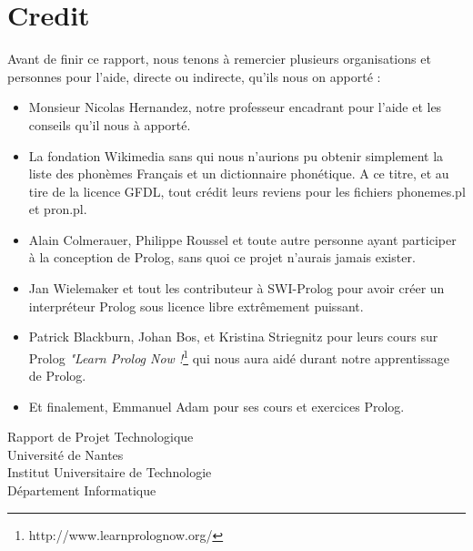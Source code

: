 \documentclass[11pt]{report}
\begin{document}
	\section{Credit}
	Avant de finir ce rapport, nous tenons à remercier plusieurs organisations et personnes pour l'aide, directe ou indirecte, qu'ils nous on apporté :
	\begin{itemize}
		\item Monsieur Nicolas Hernandez, notre professeur encadrant pour l'aide et les conseils qu'il nous à apporté.
		\item La fondation Wikimedia sans qui nous n'aurions pu obtenir simplement la liste des phonèmes Français et un dictionnaire phonétique. A ce titre, et au tire de la licence GFDL, tout crédit leurs reviens pour les fichiers phonemes.pl et pron.pl.
		\item Alain Colmerauer, Philippe Roussel et toute autre personne ayant participer à la conception de Prolog, sans quoi ce projet n'aurais jamais exister.
		\item Jan Wielemaker et tout les contributeur à SWI-Prolog pour avoir créer un interpréteur Prolog sous licence libre extrêmement puissant.
		\item  Patrick Blackburn, Johan Bos, et Kristina Striegnitz pour leurs cours sur Prolog {\em "Learn Prolog Now !}\footnote{http://www.learnprolognow.org/} qui nous aura aidé durant notre apprentissage de Prolog.
		\item Et finalement, Emmanuel Adam pour ses cours et exercices Prolog.
	\end{itemize}
	
	\newpage
	
	\begin{center}
		\Huge Rapport de Projet Technologique\\
		\bigskip 
		\bigskip 
		\bigskip 
		\bigskip 
		\LARGE Université de Nantes\\ Institut Universitaire de Technologie\\ Département Informatique
	\end{center}
	
\end{document}
